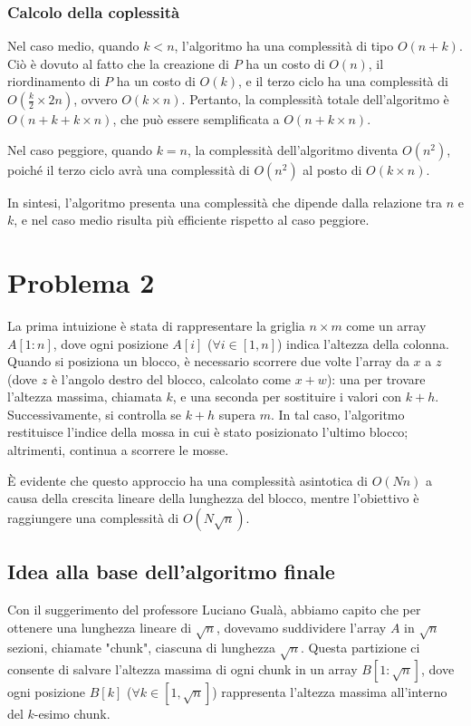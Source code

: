 \documentclass{article}
\begin{document}
\subsubsection{Calcolo della coplessità}
Nel caso medio, quando $k < n$, l'algoritmo ha una complessità di tipo $O(n+k)$. Ciò è dovuto al fatto che la creazione di $P$ ha un costo di $O(n)$, il riordinamento di $P$ ha un costo di $O(k)$, e il terzo ciclo ha una complessità di $O\left(\frac{k}{2} \times 2n\right)$, ovvero $O(k \times n)$. Pertanto, la complessità totale dell'algoritmo è $O(n+k+k \times n)$, che può essere semplificata a $O(n+k \times n)$.

Nel caso peggiore, quando $k = n$, la complessità dell'algoritmo diventa $O(n^2)$, poiché il terzo ciclo avrà una complessità di $O(n^2)$ al posto di $O(k \times n)$.

In sintesi, l'algoritmo presenta una complessità che dipende dalla relazione tra $n$ e $k$, e nel caso medio risulta più efficiente rispetto al caso peggiore.

 
 	
	

\section{Problema 2}
La prima intuizione è stata di rappresentare la griglia $n \times m$ come un array $A[1:n]$, dove ogni posizione $A[i]$ ($\forall i \in [1,n]$) indica l'altezza della colonna. Quando si posiziona un blocco, è necessario scorrere due volte l'array da $x$ a $z$ (dove $z$ è l'angolo destro del blocco, calcolato come $x + w$): una per trovare l'altezza massima, chiamata $k$, e una seconda per sostituire i valori con $k + h$. Successivamente, si controlla se $k + h$ supera $m$. In tal caso, l'algoritmo restituisce l'indice della mossa in cui è stato posizionato l'ultimo blocco; altrimenti, continua a scorrere le mosse.

È evidente che questo approccio ha una complessità asintotica di $O(Nn)$ a causa della crescita lineare della lunghezza del blocco, mentre l'obiettivo è raggiungere una complessità di $O(N\sqrt{n})$.

\subsection{Idea alla base dell'algoritmo finale}

Con il suggerimento del professore Luciano Gualà, abbiamo capito che per ottenere una lunghezza lineare di $\sqrt{n}$, dovevamo suddividere l'array $A$ in $\sqrt{n}$ sezioni, chiamate "chunk", ciascuna di lunghezza $\sqrt{n}$. Questa partizione ci consente di salvare l'altezza massima di ogni chunk in un array $B[1:\sqrt{n}]$, dove ogni posizione $B[k]$ ($\forall k \in [1,\sqrt{n}]$) rappresenta l'altezza massima all'interno del $k$-esimo chunk.
\end{document}
